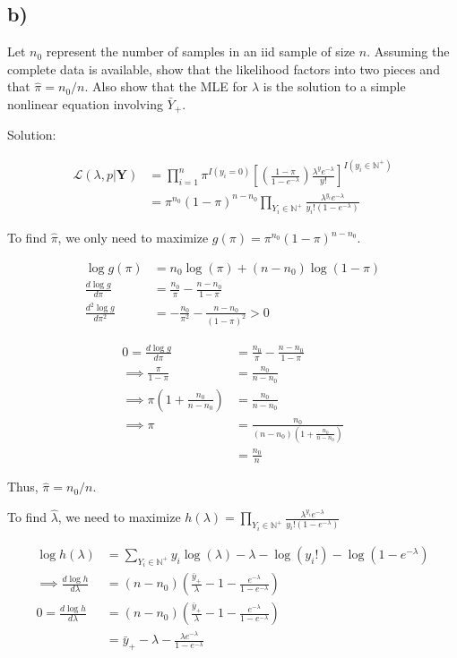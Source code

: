 \documentclass[
  letterpaper,
  DIV=11,
  numbers=noendperiod]{scrreprt}
\begin{document}
\hypertarget{b}{%
\subsection{b)}\label{b}}

Let \(n_0\) represent the number of samples in an iid sample of size
\(n\). Assuming the complete data is available, show that the likelihood
factors into two pieces and that \(\hat{\pi} = n_0/n\). Also show that
the MLE for \(\lambda\) is the solution to a simple nonlinear equation
involving \(\bar{Y}_+\).

Solution:

\[ \begin{aligned}
\mathcal{L}(\lambda, p | \mathbf{Y}) &= \prod_{i=1}^n\pi^{I(y_i=0)}
\left[\left( \frac{1-\pi}{1-e^{-\lambda}}\right)\frac{\lambda^y e^{-\lambda}}{y!}\right]^{I(y_i \in \mathbb{N}^+)} \\
&= \pi^{n_0}(1-\pi)^{n-n_0}\prod_{Y_i\in \mathbb{N}^+}\frac{\lambda^{y_i} e^{-\lambda}}{y_i! ( 1-e^{-\lambda})}
\end{aligned}
\]

To find \(\hat{\pi}\), we only need to maximize
\(g(\pi) = \pi^{n_0}(1-\pi)^{n-n_0}\).

\[\begin{aligned}
\log g(\pi) &= n_0 \log (\pi) +(n-n_0)\log(1-\pi) \\
\frac{d \log g}{d\pi} &= \frac{n_0}{\pi } -\frac{n-n_0}{1-\pi } \\
\frac{d^2 \log g}{d\pi^2} &=-\frac{n_0}{\pi^2 } - \frac{n-n_0}{(1-\pi)^2}  > 0
\end{aligned}
\]

\[\begin{aligned}
0 =\frac{d \log g}{d\pi} &= \frac{n_0}{\pi } -\frac{n-n_0}{1-\pi }  \\
\implies \frac{\pi}{1-\pi} &= \frac{n_0}{n-n_0} \\
\implies \pi\left(1+ \frac{n_0}{n-n_0}\right) &= \frac{n_0}{n-n_0} \\
\implies \pi &= \frac{n_0}{(n-n_0)\left(1+ \frac{n_0}{n-n_0}\right)} \\
&= \frac{n_0}{n}
\end{aligned}
\]

Thus, \(\hat{\pi} = n_0/n\).

To find \(\hat{\lambda}\), we need to maximize
\(h(\lambda) =\prod_{Y_i\in \mathbb{N}^+}\frac{\lambda^{y_i} e^{-\lambda}}{y_i! ( 1-e^{-\lambda})}\)

\[
\begin{aligned}
\log h(\lambda) &= \sum_{Y_i \in \mathbb{N}^+} y_i\log(\lambda) -\lambda - \log(y_i!) -\log(1-e^{-\lambda}) \\
\implies \frac{d \log h}{d \lambda} &=  (n-n_0) \left(\frac{\bar{y}_+}{\lambda}-1-\frac{ e^{-\lambda}}{1-e^{-\lambda}} \right) \\
0= \frac{d \log h}{d \lambda} &=  (n-n_0) \left(\frac{\bar{y}_+}{\lambda}-1-\frac{ e^{-\lambda}}{1-e^{-\lambda}} \right) \\
&=  \bar{y}_+-\lambda -\frac{ \lambda e^{-\lambda}}{1-e^{-\lambda}}
\end{aligned}
\]
\end{document}
